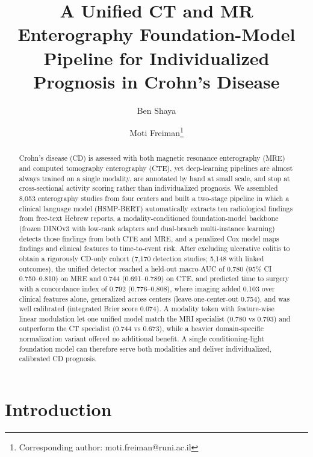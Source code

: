 \documentclass[11pt]{article}
\title{\bfseries A Unified CT and MR Enterography Foundation-Model Pipeline
for Individualized Prognosis in Crohn's Disease}
\author[1]{Ben Shaya}
\author[1,2]{Moti Freiman\thanks{Corresponding author: moti.freiman@runi.ac.il}}
\affil[1]{Faculty of Computer Science, Reichman University (RUNI), Herzliya, Israel}
\affil[2]{Shaare Zedek Medical Center, Jerusalem, Israel}
\date{}
\begin{document}
\maketitle

\begin{abstract}
\noindent
Crohn's disease (CD) is assessed with both magnetic resonance enterography (MRE)
and computed tomography enterography (CTE), yet deep-learning pipelines are almost
always trained on a single modality, are annotated by hand at small scale, and stop
at cross-sectional activity scoring rather than individualized prognosis. We assembled
8{,}053 enterography studies from four centers and built a two-stage pipeline in which
a clinical language model (HSMP-BERT) automatically extracts ten radiological findings
from free-text Hebrew reports, a modality-conditioned foundation-model backbone
(frozen DINOv3 with low-rank adapters and dual-branch multi-instance learning) detects
those findings from both CTE and MRE, and a penalized Cox model maps findings and
clinical features to time-to-event risk. After excluding ulcerative colitis to obtain
a rigorously CD-only cohort (7{,}170 detection studies; 5{,}148 with linked outcomes),
the unified detector reached a held-out macro-AUC of 0.780 (95\% CI 0.750--0.810) on MRE
and 0.744 (0.691--0.789) on CTE, and predicted time to surgery with a concordance index
of 0.792 (0.776--0.808), where imaging added 0.103 over clinical features alone, generalized across
centers (leave-one-center-out 0.754), and was well calibrated (integrated Brier score 0.074). A modality
token with feature-wise
linear modulation let one unified model match the MRI specialist (0.780 vs 0.793) and outperform the
CT specialist (0.744 vs 0.673), while a heavier domain-specific normalization variant offered no
additional benefit. A single conditioning-light foundation model can therefore serve both modalities and deliver
individualized, calibrated CD prognosis.
\end{abstract}

\section*{Introduction}
\label{sec:introduction}
\end{document}
